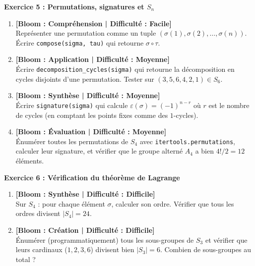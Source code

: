 \noindent\textbf{Exercice 5 : Permutations, signatures et $S_n$}
\begin{enumerate}
    \item \textbf{[Bloom : Compréhension | Difficulté : Facile]} \\
    Représenter une permutation comme un tuple $(\sigma(1), \sigma(2), \dots, \sigma(n))$. Écrire \texttt{compose(sigma, tau)} qui retourne $\sigma \circ \tau$.
    \item \textbf{[Bloom : Application | Difficulté : Moyenne]} \\
    Écrire \texttt{decomposition\_cycles(sigma)} qui retourne la décomposition en cycles disjoints d'une permutation. Tester sur $(3, 5, 6, 4, 2, 1) \in S_6$.
    \item \textbf{[Bloom : Synthèse | Difficulté : Moyenne]} \\
    Écrire \texttt{signature(sigma)} qui calcule $\varepsilon(\sigma) = (-1)^{n - r}$ où $r$ est le nombre de cycles (en comptant les points fixes comme des $1$-cycles).
    \item \textbf{[Bloom : Évaluation | Difficulté : Moyenne]} \\
    Énumérer toutes les permutations de $S_4$ avec \texttt{itertools.permutations}, calculer leur signature, et vérifier que le groupe alterné $A_4$ a bien $4! / 2 = 12$ éléments.
\end{enumerate}

\vspace{0.3cm}

\noindent\textbf{Exercice 6 : Vérification du théorème de Lagrange}
\begin{enumerate}
    \item \textbf{[Bloom : Synthèse | Difficulté : Difficile]} \\
    Sur $S_4$ : pour chaque élément $\sigma$, calculer son ordre. Vérifier que tous les ordres divisent $|S_4| = 24$.
    \item \textbf{[Bloom : Création | Difficulté : Difficile]} \\
    Énumérer (programmatiquement) tous les sous-groupes de $S_3$ et vérifier que leurs cardinaux ($1, 2, 3, 6$) divisent bien $|S_3| = 6$. Combien de sous-groupes au total ?
\end{enumerate}

\vspace{0.3cm}

